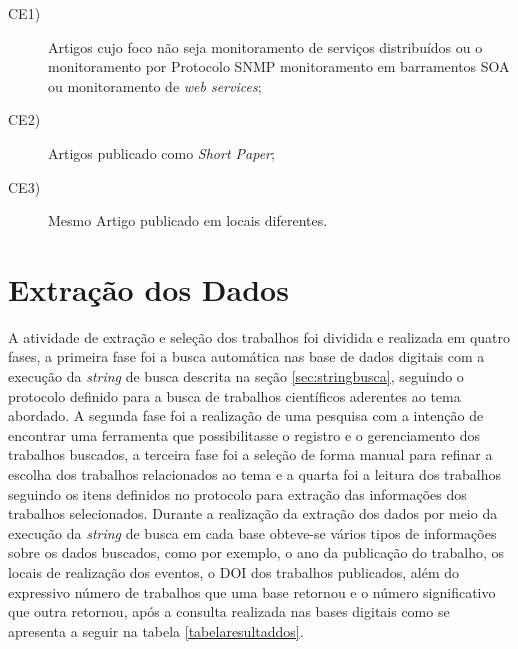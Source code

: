 \begin{description}
\item[CE1)]Artigos cujo foco não seja monitoramento de serviços distribuídos ou o monitoramento por Protocolo \acrshort{SNMP} monitoramento em barramentos \acrshort{SOA} ou monitoramento de \textit{web services};
\item[CE2)] Artigos publicado como \textit{Short Paper};
\item[CE3)] Mesmo Artigo publicado em locais diferentes.
\end{description}


\section{Extração dos Dados}
A atividade de extração e seleção dos trabalhos foi dividida e realizada em quatro fases, a primeira fase foi a busca automática nas base de dados digitais com a execução da \textit{string} de busca descrita na seção \ref{sec:stringbusca}, seguindo o protocolo definido para a busca de trabalhos científicos aderentes ao tema abordado. A segunda fase foi a realização de uma pesquisa com a intenção de encontrar uma ferramenta que possibilitasse o registro e o gerenciamento dos trabalhos buscados, a terceira fase foi a seleção de forma manual para refinar a escolha dos trabalhos relacionados ao tema e a quarta foi a leitura dos trabalhos seguindo os itens definidos no protocolo para extração das informações dos trabalhos selecionados. Durante a realização da extração dos dados por meio da execução da \textit{string} de busca em cada base obteve-se vários tipos de informações sobre os dados buscados, como por exemplo, o ano da publicação do trabalho, os locais de realização dos eventos, o \acrshort{DOI} dos trabalhos publicados, além do  expressivo número de trabalhos que uma base retornou e o número significativo que outra retornou, após a consulta realizada nas bases digitais como se apresenta a seguir na tabela \ref{tabelaresultaddos}.

